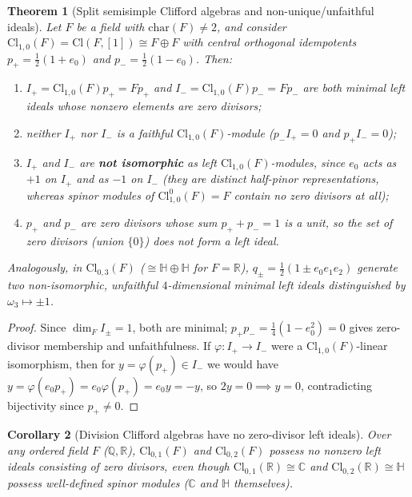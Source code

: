 \documentclass[11pt]{article}
\newtheorem{theorem}{Theorem}[section]
\newtheorem{corollary}[theorem]{Corollary}
\theoremstyle{definition}
\newcommand{\Cl}{\mathrm{Cl}}
\begin{document}
\begin{theorem}[Split semisimple Clifford algebras and non-unique/unfaithful ideals]
\label{thm:split}
Let $F$ be a field with $\mathrm{char}(F) \neq 2$, and consider
$\Cl_{1,0}(F) = \Cl(F, [1]) \cong F \oplus F$ with central orthogonal idempotents
$p_+ = \frac{1}{2}(1 + e_0)$ and $p_- = \frac{1}{2}(1 - e_0)$. Then:
\begin{enumerate}
  \item $I_+ = \Cl_{1,0}(F)p_+ = F p_+$ and $I_- = \Cl_{1,0}(F)p_- = F p_-$ are
    both minimal left ideals whose nonzero elements are zero divisors;
  \item neither $I_+$ nor $I_-$ is a faithful $\Cl_{1,0}(F)$-module
    ($p_- I_+ = 0$ and $p_+ I_- = 0$);
  \item $I_+$ and $I_-$ are \textbf{not isomorphic} as left $\Cl_{1,0}(F)$-modules,
    since $e_0$ acts as $+1$ on $I_+$ and as $-1$ on $I_-$ (they are distinct
    half-pinor representations, whereas spinor modules of $\Cl^0_{1,0}(F) = F$
    contain no zero divisors at all);
  \item $p_+$ and $p_-$ are zero divisors whose sum $p_+ + p_- = 1$ is a unit, so
    the set of zero divisors (union $\{0\}$) does not form a left ideal.
\end{enumerate}
Analogously, in $\Cl_{0,3}(F)$ ($\cong \mathbb{H} \oplus \mathbb{H}$ for $F = \mathbb{R}$),
$q_\pm = \frac{1}{2}(1 \pm e_0 e_1 e_2)$ generate two non-isomorphic, unfaithful
$4$-dimensional minimal left ideals distinguished by $\omega_3 \mapsto \pm 1$.
\end{theorem}
\begin{proof}
Since $\dim_F I_\pm = 1$, both are minimal; $p_+ p_- = \frac{1}{4}(1 - e_0^2) = 0$
gives zero-divisor membership and unfaithfulness. If $\varphi : I_+ \to I_-$ were
a $\Cl_{1,0}(F)$-linear isomorphism, then for $y = \varphi(p_+) \in I_-$ we would have
$y = \varphi(e_0 p_+) = e_0 \varphi(p_+) = e_0 y = -y$, so $2y = 0 \implies y = 0$,
contradicting bijectivity since $p_+ \neq 0$.
\end{proof}

\begin{corollary}[Division Clifford algebras have no zero-divisor left ideals]
\label{cor:division}
Over any ordered field $F$ ($\mathbb{Q}, \mathbb{R}$), $\Cl_{0,1}(F)$ and
$\Cl_{0,2}(F)$ possess no nonzero left ideals consisting of zero divisors, even
though $\Cl_{0,1}(\mathbb{R}) \cong \mathbb{C}$ and
$\Cl_{0,2}(\mathbb{R}) \cong \mathbb{H}$ possess well-defined spinor modules
($\mathbb{C}$ and $\mathbb{H}$ themselves).
\end{corollary}
\end{document}
